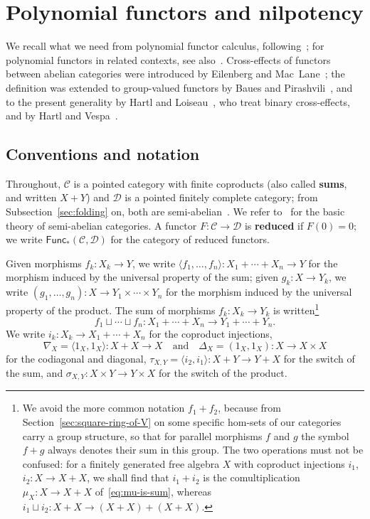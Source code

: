 \documentclass[reqno,a4paper]{amsart}
\theoremstyle{plain}
\theoremstyle{definition}
\newcommand{\defn}{\textbf}
\newcommand{\C}{\ensuremath{\mathcal{C}}}
\newcommand{\D}{\ensuremath{\mathcal{D}}}
\newcommand{\Func}{\ensuremath{\mathsf{Func}}}
\newcommand{\cosum}{\ensuremath{\sqcup}}                   %
\newcommand{\tw}[2]{\ensuremath{\tau_{#1,#2}}}             %
\newcommand{\twp}[2]{\ensuremath{\sigma_{#1,#2}}}          %
\newcommand{\fold}[1]{\ensuremath{\nabla_{#1}}}            %
\newcommand{\diag}[1]{\ensuremath{\Delta_{#1}}}            %
\begin{document}
\section{Polynomial functors and nilpotency}\label{sec:polynomial}

We recall what we need from polynomial functor calculus, following~\cite{Hartl-Vespa, Actions, HVdL, DHVdL}; for polynomial functors in related contexts, see also~\cite{Baues:Metastable, HPV}. Cross-effects of functors between abelian categories were introduced by Eilenberg and Mac~Lane~\cite{Eilenberg-MacLane}; the definition was extended to group-valued functors by Baues and Pirashvili~\cite{Baues-Pirashvili}, and to the present generality by Hartl and Loiseau~\cite{Actions}, who treat binary cross-effects, and by Hartl and Vespa~\cite{Hartl-Vespa}.

\subsection{Conventions and notation}\label{sec:conventions}
Throughout, \(\C\) is a pointed category with finite coproducts (also called \defn{sums}, and written \(X+Y\)) and \(\D\) is a pointed finitely complete category; from Subsection~\ref{sec:folding} on, both are semi-abelian~\cite{Janelidze-Marki-Tholen, WorkingMathematician}. We refer to~\cite{Borceux-Bourn} for the basic theory of semi-abelian categories. A functor \(F\colon \C\to\D\) is \defn{reduced} if \(F(0)=0\); we write \(\Func_{*}(\C,\D)\) for the category of reduced functors.

Given morphisms \(f_{k}\colon X_{k}\to Y\), we write \(\langle f_{1},\dots,f_{n}\rangle\colon X_{1}+\cdots+X_{n}\to Y\) for the morphism induced by the universal property of the sum; given \(g_{k}\colon {X\to Y_{k}}\), we write \((g_{1},\dots,g_{n})\colon X\to Y_{1}\times\cdots\times Y_{n}\) for the morphism induced by the universal property of the product. The sum of morphisms \(f_{k}\colon X_{k}\to Y_{k}\) is written\footnote{We avoid the more common notation \(f_{1}+f_{2}\), because from Section~\ref{sec:square-ring-of-V} on some specific hom-sets of our categories carry a group structure, so that for parallel morphisms \(f\) and \(g\) the symbol \(f+g\) always denotes their sum in this group. The two operations must not be confused: for a finitely generated free algebra \(X\) with coproduct injections \(i_{1}\), \(i_{2}\colon X\to X+X\), we shall find that \(i_{1}+i_{2}\) is the comultiplication \(\mu_{X}\colon {X\to X+X}\) of~\eqref{eq:mu-is-sum}, whereas \(i_{1}\cosum i_{2}\colon X+X\to(X+X)+(X+X)\).}
\[
  f_{1}\cosum\cdots\cosum f_{n}\colon X_{1}+\cdots+X_{n}\to Y_{1}+\cdots+Y_{n}\text{.}
\]
We write \(i_{k}\colon X_{k}\to X_{1}+\cdots+X_{n}\) for the coproduct injections,
\[
  \fold{X}=\langle 1_{X},1_{X}\rangle\colon {X+X\to X}
  \quad\text{and}\quad
  \diag{X}=(1_{X},1_{X})\colon X\to X\times X
\]
for the codiagonal and diagonal, \(\tw{X}{Y}=\langle i_{2},i_{1}\rangle\colon X+Y\to Y+X\) for the switch of the sum, and \(\twp{X}{Y}\colon X\times Y\to Y\times X\) for the switch of the product.
\end{document}

